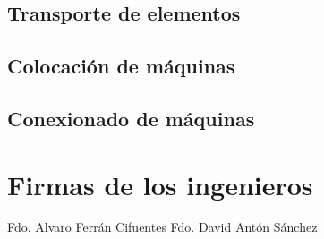 \subsection{Transporte de elementos}

\subsection{Colocación de máquinas}

\subsection{Conexionado de máquinas}


\newpage\section {Firmas de los ingenieros}
\vspace{5cm}
Fdo. Alvaro Ferrán Cifuentes
\vspace{5cm}\hspace{5cm}
Fdo. David Antón Sánchez

